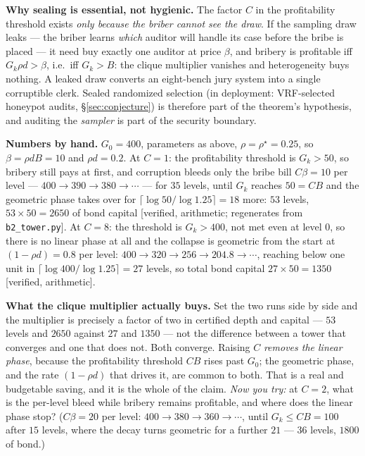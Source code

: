 \documentclass[11pt,a4paper]{article}
\begin{document}
\textbf{Why sealing is essential, not hygienic.} The factor $C$ in the profitability threshold exists \emph{only because the briber cannot see the draw}. If the sampling draw leaks --- the briber learns \emph{which} auditor will handle its case before the bribe is placed --- it need buy exactly one auditor at price $\beta$, and bribery is profitable iff $G_k \rho d > \beta$, i.e.\ iff $G_k > B$: the clique multiplier vanishes and heterogeneity buys nothing. A leaked draw converts an eight-bench jury system into a single corruptible clerk. Sealed randomized selection (in deployment: VRF-selected honeypot audits, \S\ref{sec:conjecture}) is therefore part of the theorem's hypothesis, and auditing the \emph{sampler} is part of the security boundary.

\textbf{Numbers by hand.} $G_0 = 400$, parameters as above, $\rho = \rho^\star = 0.25$, so $\beta = \rho d B = 10$ and $\rho d = 0.2$. At $C{=}1$: the profitability threshold is $G_k > 50$, so bribery still pays at first, and corruption bleeds only the bribe bill $C\beta = 10$ per level --- $400 \to 390 \to 380 \to \cdots$ --- for $35$ levels, until $G_k$ reaches $50 = CB$ and the geometric phase takes over for $\lceil \log 50/\log 1.25\rceil = 18$ more: $53$ levels, $53 \times 50 = 2650$ of bond capital [verified, arithmetic; regenerates from \texttt{b2\_tower.py}]. At $C{=}8$: the threshold is $G_k > 400$, not met even at level 0, so there is no linear phase at all and the collapse is geometric from the start at $(1-\rho d) = 0.8$ per level: $400 \to 320 \to 256 \to 204.8 \to \cdots$, reaching below one unit in $\lceil \log 400 / \log 1.25 \rceil = 27$ levels, so total bond capital $27 \times 50 = 1350$ [verified, arithmetic].

\textbf{What the clique multiplier actually buys.} Set the two runs side by side and the multiplier is precisely a factor of two in certified depth and capital --- $53$ levels and $2650$ against $27$ and $1350$ --- not the difference between a tower that converges and one that does not. Both converge. Raising $C$ \emph{removes the linear phase}, because the profitability threshold $CB$ rises past $G_0$; the geometric phase, and the rate $(1-\rho d)$ that drives it, are common to both. That is a real and budgetable saving, and it is the whole of the claim. \emph{Now you try:} at $C{=}2$, what is the per-level bleed while bribery remains profitable, and where does the linear phase stop? ($C\beta = 20$ per level: $400 \to 380 \to 360 \to \cdots$, until $G_k \le CB = 100$ after $15$ levels, where the decay turns geometric for a further $21$ --- $36$ levels, $1800$ of bond.)
\end{document}
